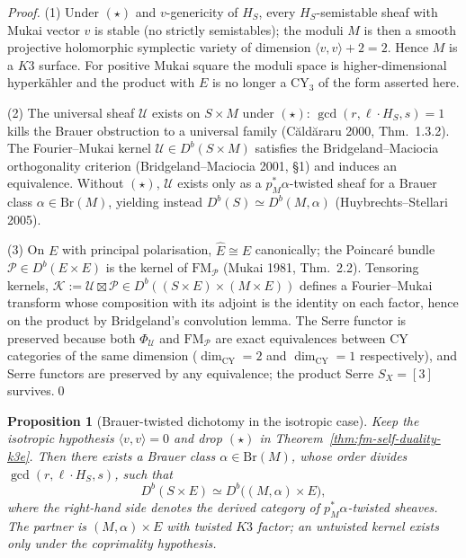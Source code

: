 \documentclass[12pt]{amsart}
\newtheorem{prop}[thm]{Proposition}
\theoremstyle{remark}
\begin{document}
\begin{proof}
  (1) Under $(\star)$ and $v$-genericity of $H_S$, every
  $H_S$-semistable sheaf with Mukai vector $v$ is stable
  (no strictly semistables); the moduli $M$ is then a smooth projective
  holomorphic symplectic variety of dimension
  \(\langle v,v\rangle+2=2\).  Hence \(M\) is a \(K3\) surface.  For
  positive Mukai square the moduli space is higher-dimensional
  hyperk\"ahler and the product with \(E\) is no longer a CY$_3$ of the
  form asserted here.

  (2) The universal sheaf $\mathcal{U}$ exists on $S \times M$ under
  $(\star)$: $\gcd(r, \ell \cdot H_S, s) = 1$ kills the Brauer
  obstruction to a universal family (C\u{a}ld\u{a}raru 2000,
  Thm.\ 1.3.2). The Fourier--Mukai kernel
  $\mathcal{U} \in D^b(S \times M)$ satisfies the
  Bridgeland--Maciocia orthogonality criterion
  (Bridgeland--Maciocia 2001, \S 1) and induces an equivalence.
  Without $(\star)$, $\mathcal{U}$ exists only as a
  $p_M^*\alpha$-twisted sheaf for a Brauer class $\alpha \in
  \mathrm{Br}(M)$, yielding instead $D^b(S) \simeq D^b(M, \alpha)$
  (Huybrechts--Stellari 2005).

  (3) On $E$ with principal polarisation, $\hat{E} \cong E$
  canonically; the Poincar\'e bundle $\mathcal{P} \in D^b(E \times E)$
  is the kernel of $\mathrm{FM}_{\mathcal{P}}$ (Mukai 1981, Thm.\
  2.2). Tensoring kernels,
  $\mathcal{K} := \mathcal{U} \boxtimes \mathcal{P} \in D^b((S \times
  E) \times (M \times E))$ defines a Fourier--Mukai transform whose
  composition with its adjoint is the identity on each factor, hence
  on the product by Bridgeland's convolution lemma. The Serre functor
  is preserved because both $\Phi_{\mathcal{U}}$ and
  $\mathrm{FM}_{\mathcal{P}}$ are exact equivalences between
  CY categories of the same dimension ($\dim_{\mathrm{CY}} = 2$ and
  $\dim_{\mathrm{CY}} = 1$ respectively), and Serre functors are
  preserved by any equivalence; the product Serre $S_X = [3]$
  survives.\qed
\end{proof}

\begin{prop}[Brauer-twisted dichotomy in the isotropic case]
  \label{prop:coprimality-dichotomy}
  Keep the isotropic hypothesis \(\langle v,v\rangle=0\) and drop
  $(\star)$ in Theorem~\ref{thm:fm-self-duality-k3e}. Then there
  exists a Brauer class $\alpha \in \mathrm{Br}(M)$, whose order
  divides $\gcd(r, \ell \cdot H_S, s)$, such that
  $$D^b(S \times E) \simeq D^b\bigl((M, \alpha) \times E\bigr),$$
  where the right-hand side denotes the derived category of
  $p_M^*\alpha$-twisted sheaves. The partner is
  \((M,\alpha)\times E\) with twisted \(K3\) factor; an untwisted
  kernel exists only under the coprimality hypothesis.
\end{prop}
\end{document}

